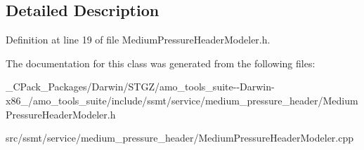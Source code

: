 \subsection{Detailed Description}


Definition at line 19 of file Medium\+Pressure\+Header\+Modeler.\+h.



The documentation for this class was generated from the following files\+:\begin{DoxyCompactItemize}
\item 
\+\_\+\+C\+Pack\+\_\+\+Packages/\+Darwin/\+S\+T\+G\+Z/amo\+\_\+tools\+\_\+suite-\/-\/\+Darwin-\/x86\+\_/amo\+\_\+tools\+\_\+suite/include/ssmt/service/medium\+\_\+pressure\+\_\+header/Medium\+Pressure\+Header\+Modeler.\+h\item 
src/ssmt/service/medium\+\_\+pressure\+\_\+header/Medium\+Pressure\+Header\+Modeler.\+cpp\end{DoxyCompactItemize}
